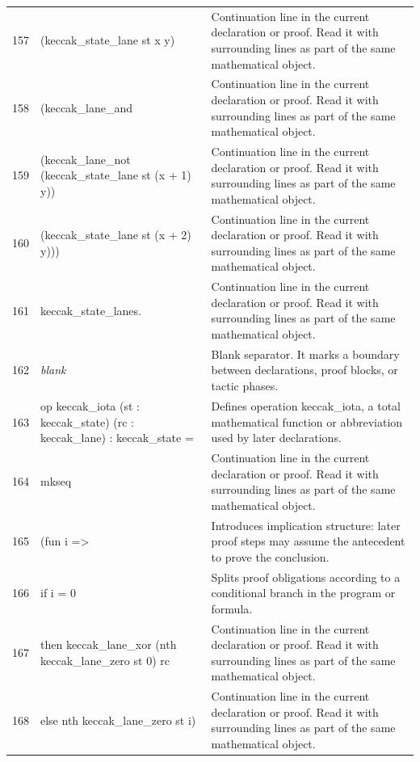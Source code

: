 \documentclass[10pt]{article}
\begin{document}
\begin{longtable}{r L{0.53\textwidth} L{0.37\textwidth}}
157 & {\ttfamily\scriptsize          (keccak\_state\_lane st x y)} & Continuation line in the current declaration or proof.  Read it with surrounding lines as part of the same mathematical object. \\
158 & {\ttfamily\scriptsize          (keccak\_lane\_and} & Continuation line in the current declaration or proof.  Read it with surrounding lines as part of the same mathematical object. \\
159 & {\ttfamily\scriptsize            (keccak\_lane\_not (keccak\_state\_lane st (x + 1) y))} & Continuation line in the current declaration or proof.  Read it with surrounding lines as part of the same mathematical object. \\
160 & {\ttfamily\scriptsize            (keccak\_state\_lane st (x + 2) y)))} & Continuation line in the current declaration or proof.  Read it with surrounding lines as part of the same mathematical object. \\
161 & {\ttfamily\scriptsize     keccak\_state\_lanes.} & Continuation line in the current declaration or proof.  Read it with surrounding lines as part of the same mathematical object. \\
162 & {\ttfamily\scriptsize \emph{blank}} & Blank separator.  It marks a boundary between declarations, proof blocks, or tactic phases. \\
163 & {\ttfamily\scriptsize op keccak\_iota (st : keccak\_state) (rc : keccak\_lane) : keccak\_state =} & Defines operation keccak\_iota, a total mathematical function or abbreviation used by later declarations. \\
164 & {\ttfamily\scriptsize   mkseq} & Continuation line in the current declaration or proof.  Read it with surrounding lines as part of the same mathematical object. \\
165 & {\ttfamily\scriptsize     (fun i =>} & Introduces implication structure: later proof steps may assume the antecedent to prove the conclusion. \\
166 & {\ttfamily\scriptsize        if i = 0} & Splits proof obligations according to a conditional branch in the program or formula. \\
167 & {\ttfamily\scriptsize        then keccak\_lane\_xor (nth keccak\_lane\_zero st 0) rc} & Continuation line in the current declaration or proof.  Read it with surrounding lines as part of the same mathematical object. \\
168 & {\ttfamily\scriptsize        else nth keccak\_lane\_zero st i)} & Continuation line in the current declaration or proof.  Read it with surrounding lines as part of the same mathematical object. \\

\end{longtable}
\end{document}
